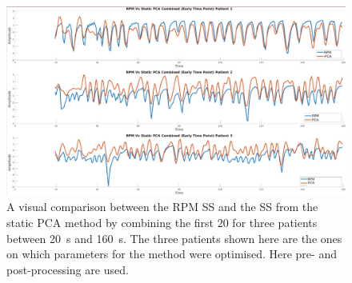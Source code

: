             \begin{figure}
                \centering
                
                \includegraphics[width=1.0\linewidth]{figures/data_driven_surrogate_signal_extraction_results_1_combined_surrogate_signal_processed.png}
                
                \captionsetup{singlelinecheck=false, justification=centering}
                \caption{A visual comparison between the \gls{RPM} \gls{SS} and the \gls{SS} from the static \gls{PCA} method by combining the first $20$  for three patients between \SI{20}{\second} and \SI{160}{\second}. The three patients shown here are the ones on which parameters for the method were optimised. Here pre- and post-processing are used.}
                \label{fig:pca_data_driven_surrogate_signal_extraction_methods_for_dynamic_pet_results_combined_surrogate_signal_processed}
            \end{figure}
            
